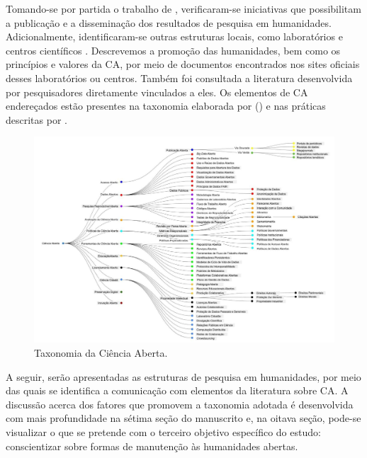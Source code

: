 \documentclass[portuguese]{textolivre}
\begin{document}
Tomando-se por partida o trabalho de \textcite{earnshaw2018}, verificaram-se iniciativas que possibilitam a publicação e a disseminação dos resultados de pesquisa em humanidades. Adicionalmente, identificaram-se outras estruturas locais, como laboratórios e centros científicos \cite{delrio2022}. Descrevemos a promoção das humanidades, bem como os princípios e valores da CA, por meio de documentos encontrados nos sites oficiais desses laboratórios ou centros. Também foi consultada a literatura desenvolvida por pesquisadores diretamente vinculados a eles. Os elementos de CA endereçados estão presentes na taxonomia elaborada por \textcite{silveira2021} () e nas práticas descritas por \textcite{morais2021}.

\begin{figure}
\centering
\begin{minipage}{\textwidth}
    \includegraphics[width=\linewidth]{Fig1.png}
    \caption{Taxonomia da Ciência Aberta.}
    \label{fig1}
\end{minipage}
\end{figure}

A seguir, serão apresentadas as estruturas de pesquisa em humanidades, por meio das quais se identifica a comunicação com elementos da literatura sobre CA. A discussão acerca dos fatores que promovem a taxonomia adotada é desenvolvida com mais profundidade na sétima seção do manuscrito e, na oitava seção, pode-se visualizar o que se pretende com o terceiro objetivo específico do estudo: conscientizar sobre formas de manutenção às humanidades abertas.
\end{document}
